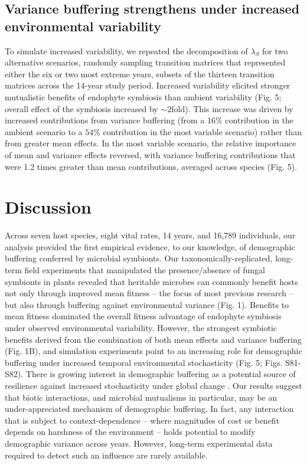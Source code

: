 \documentclass[lineno, sn-basic]{sn-jnl}%
\begin{document}
\subsection*{Variance buffering strengthens under increased environmental variability}
To simulate increased variability, we repeated the decomposition of $\lambda_{S}$ for two alternative scenarios, randomly sampling transition matrices that represented either the six or two most extreme years, subsets of the thirteen transition matrices across the 14-year study period. 
Increased variability elicited stronger mutualistic benefits of endophyte symbiosis than ambient variability (Fig. 5; overall effect of the symbiosis increased by $\sim{2}$fold).
This increase was driven by increased contributions from variance buffering (from a $16\%$ contribution in the ambient scenario to a $54$\% contribution in the most variable scenario) rather than from greater mean effects.
In the most variable scenario, the relative importance of mean and variance effects reversed, with variance buffering contributions that were 1.2 times greater than mean contributions, averaged across species (Fig. 5). 

\section*{Discussion}
Across seven host species, eight vital rates, 14 years, and 16,789 individuals, our analysis provided the first empirical evidence, to our knowledge, of demographic buffering conferred by microbial symbionts. 
Our taxonomically-replicated, long-term field experiments that manipulated the presence/absence of fungal symbionts in plants revealed that heritable microbes can commonly benefit hosts not only through improved mean fitness -- the focus of most previous research -- but also through buffering against environmental variance (Fig. 1). 
Benefits to mean fitness dominated the overall fitness advantage of endophyte symbiosis under observed environmental variability. 
However, the strongest symbiotic benefits derived from the combination of both mean effects and variance buffering (Fig. 1B), and simulation experiments point to an increasing role for demographic buffering under increased temporal environmental stochasticity (Fig. 5; Figs. S81-S82).
There is growing interest in demographic buffering as a potential source of resilience against increased stochasticity under global change \citep{hilde_demographic_2020}. 
Our results suggest that biotic interactions, and microbial mutualisms in particular, may be an under-appreciated mechanism of demographic buffering. 
In fact, any interaction that is subject to context-dependence -- where magnitudes of cost or benefit depends on harshness of the environment -- holds potential to modify demographic variance across years. 
However, long-term experimental data required to detect such an influence are rarely available. 
\end{document}

